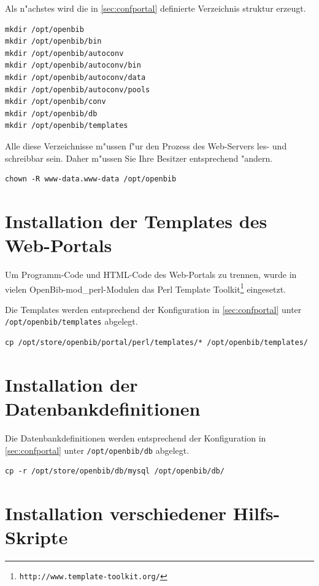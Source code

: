 \documentclass[11pt, twoside, a4paper, BCOR8mm, DIV12, bibtotoc,idxtotoc]{scrbook}
\begin{document}
Als n"achstes wird die in \ref{sec:confportal} definierte Verzeichnis
struktur erzeugt.

\begin{verbatim}
mkdir /opt/openbib
mkdir /opt/openbib/bin
mkdir /opt/openbib/autoconv
mkdir /opt/openbib/autoconv/bin
mkdir /opt/openbib/autoconv/data
mkdir /opt/openbib/autoconv/pools
mkdir /opt/openbib/conv
mkdir /opt/openbib/db
mkdir /opt/openbib/templates
\end{verbatim}

Alle diese Verzeichnisse m"ussen f"ur den Prozess des Web-Servers
les- und schreibbar sein. Daher m"ussen Sie Ihre Besitzer entsprechend
"andern.

\begin{verbatim}
chown -R www-data.www-data /opt/openbib
\end{verbatim}

\section{Installation der Templates des Web-Portals}

Um Programm-Code und HTML-Code des Web-Portals zu trennen, wurde in
vielen OpenBib-mod\_perl-Modulen das Perl Template
Toolkit\footnote{\texttt{http://www.template-toolkit.org/}}
eingesetzt.

Die Templates werden entsprechend der Konfiguration in
\ref{sec:confportal} unter \texttt{/opt/openbib/templates} abgelegt.

\begin{verbatim}
cp /opt/store/openbib/portal/perl/templates/* /opt/openbib/templates/
\end{verbatim}

\section{Installation der Datenbankdefinitionen}

Die Datenbankdefinitionen werden entsprechend der Konfiguration in
\ref{sec:confportal} unter \texttt{/opt/openbib/db} abgelegt.

\begin{verbatim}
cp -r /opt/store/openbib/db/mysql /opt/openbib/db/
\end{verbatim}

\section{Installation verschiedener Hilfs-Skripte}
\end{document}
